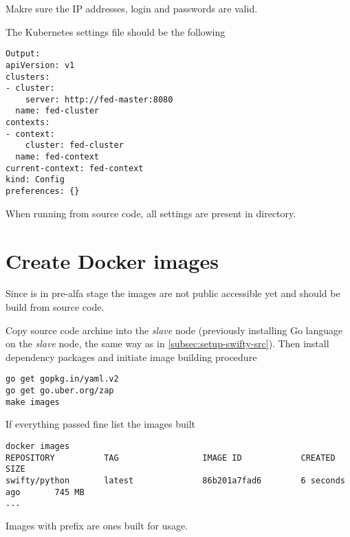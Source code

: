 Makre sure the IP addresses, login and passwords are valid.

The Kubernetes settings file should be the following

\begin{lstlisting}
Output:
apiVersion: v1
clusters:
- cluster:
    server: http://fed-master:8080
  name: fed-cluster
contexts:
- context:
    cluster: fed-cluster
  name: fed-context
current-context: fed-context
kind: Config
preferences: {}
\end{lstlisting}

When running from  source code, all settings are present
in  directory.

\section{Create Docker images}
\label{sec:setup-images}

Since  is in pre-alfa stage the images are not public
accessible yet and should be build from  source code.

Copy source code archine into the \emph{slave} node (previously
installing Go language on the \emph{slave} node, the same way
as in \ref{subsec:setup-swifty-src}). Then install dependency packages
and initiate image building procedure

\begin{lstlisting}
go get gopkg.in/yaml.v2
go get go.uber.org/zap
make images
\end{lstlisting}

If everything passed fine list the images built

\begin{lstlisting}
docker images
REPOSITORY          TAG                 IMAGE ID            CREATED             SIZE
swifty/python       latest              86b201a7fad6        6 seconds ago       745 MB
...
\end{lstlisting}

Images with  prefix are ones built for  usage.
